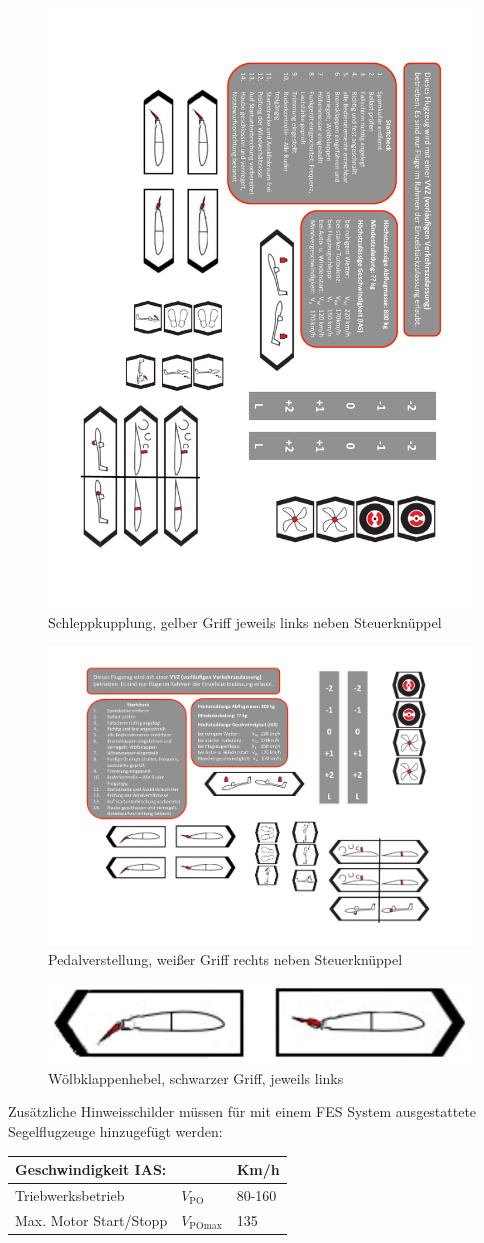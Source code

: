 \begin{figure}[H]
\begin{center}
\includegraphics[width=.15\textwidth]{bilder/kupplung.pdf}
\caption*{Schleppkupplung, gelber Griff jeweils links neben Steuerknüppel}
\end{center}
\end{figure}

\begin{figure}[H]
\begin{center}
\includegraphics[width=.15\textwidth]{bilder/pedale.pdf}
\caption*{Pedalverstellung, weißer Griff rechts neben Steuerknüppel}
\end{center}
\end{figure}

\begin{figure}[H]
\begin{center}
\includegraphics[width=.45\textwidth]{bilder/wk.pdf}
\caption*{Wölbklappenhebel, schwarzer Griff, jeweils links}
\end{center}
\end{figure}

Zusätzliche Hinweisschilder müssen für mit einem FES System ausgestattete
Segelflugzeuge hinzugefügt werden:\\

\begin{center}
\begin{tabular}[H]{|l|l|l|}
\hline
\multicolumn{2}{|l|}{\textbf{Geschwindigkeit IAS:}} & Km/h \\
\hline
Triebwerksbetrieb & $V_\text{PO}$ & 80-160 \\
\hline
Max. Motor Start/Stopp & $V_\text{POmax}$ & 135 \\
\hline
\end{tabular}
\end{center}


